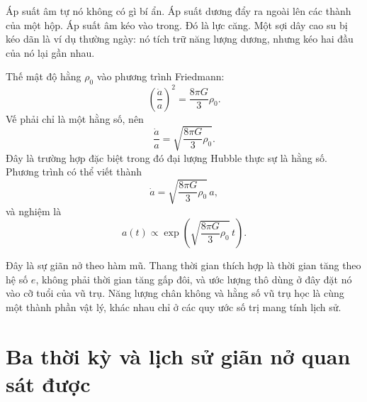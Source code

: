 Áp suất âm tự nó không có gì bí ẩn. Áp suất dương đẩy ra ngoài lên các thành của một hộp. Áp suất âm kéo vào trong. Đó là lực căng. Một sợi dây cao su bị kéo dãn là ví dụ thường ngày: nó tích trữ năng lượng dương, nhưng kéo hai đầu của nó lại gần nhau.

Thế mật độ hằng \(\rho_0\) vào phương trình Friedmann:
\begin{equation}
\left(\frac{\dot a}{a}\right)^2=\frac{8\pi G}{3}\rho_0.
\end{equation}
Vế phải chỉ là một hằng số, nên
\begin{equation}
\frac{\dot a}{a}=\sqrt{\frac{8\pi G}{3}\rho_0}.
\end{equation}
Đây là trường hợp đặc biệt trong đó đại lượng Hubble thực sự là hằng số. Phương trình có thể viết thành
\begin{equation}
\dot a=\sqrt{\frac{8\pi G}{3}\rho_0}\,a,
\end{equation}
và nghiệm là
\begin{equation}
a(t)\propto \exp\!\left(\sqrt{\frac{8\pi G}{3}\rho_0}\,t\right).
\end{equation}

Đây là sự giãn nở theo hàm mũ. Thang thời gian thích hợp là thời gian tăng theo hệ số \(e\), không phải thời gian tăng gấp đôi, và ước lượng thô dùng ở đây đặt nó vào cỡ tuổi của vũ trụ. Năng lượng chân không và hằng số vũ trụ học là cùng một thành phần vật lý, khác nhau chỉ ở các quy ước số trị mang tính lịch sử.

\begin{classroomqa}
\end{classroomqa}

\begin{classroomqa}
\end{classroomqa}

\section{Ba thời kỳ và lịch sử giãn nở quan sát được}

